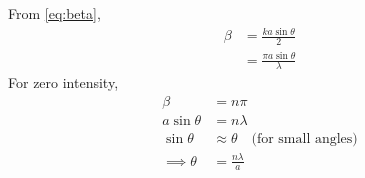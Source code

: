 \documentclass[journal,12pt,twocolumn]{IEEEtran}
\theoremstyle{remark}
\begin{document}
From \eqref{eq:beta},
\begin{align}	
	\beta &= \frac{ka\sin{\theta}}{2} \\
	&= \frac{\pi a\sin{\theta}}{\lambda}
\end{align}
For zero intensity,
\begin{align}
    \beta &= n\pi \\
    a\sin{\theta} &= n\lambda \\
    \sin{\theta} &\approx \theta \quad \text{(for small angles)} \\
    \implies \theta &= \frac{n\lambda}{a}
\end{align}
\end{document}
